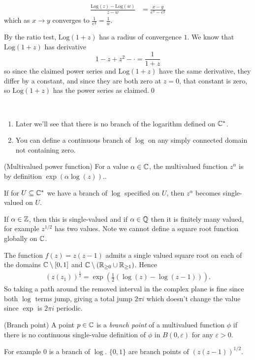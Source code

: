 \documentclass{article}
\newcommand{\Log}{\mathrm{Log}}
\begin{document}
\begin{align*}
	\frac{\Log(z)-\Log(w)}{z-w} &= \frac{x-y}{e^x-e^y}
\end{align*}
which as $ x\to y $ converges to $ \frac 1{e^y} = \frac 1w $.\par
By the ratio test, $ \Log(1+z) $ has a radius of convergence $ 1 $. We know that $ \Log(1+z) $ has derivative
\[
	1-z+z^2-\cdot = \frac 1{1+z}
\]
so since the claimed power series and $ \Log(1+z) $ have the same derivative, they differ by a constant, and since they are both zero at $ z=0 $, that constant is zero, so $ \Log(1+z) $ has the power series as claimed.\qed
\begin{remark}
  \
  \begin{enumerate}
	  \item Later we'll see that there is no branch of the logarithm defined on $ \mathbb{C}^* $.
	  \item You can define a continuous branch of $ \log $ on any simply connected domain not containing zero.
  \end{enumerate}
\end{remark}
\begin{definition}
	(Multivalued power function) For a value $ \alpha\in \mathbb{C} $, the multivalued function $ z^\alpha $ is by definition $ \exp(\alpha\log(z)). $.
\end{definition}
\begin{remark}
	If for $ U\subseteq \mathbb{C}^* $ we have a branch of $ \log $ specified on $ U $, then $ z^\alpha $ becomes single-valued on $ U $.
\end{remark}
\begin{remark}
	If $ \alpha\in \mathbb{Z} $, then this is single-valued and if $ \alpha\in \mathbb{Q} $ then it is finitely many valued, for example $ z^{1/2} $ has two values. Note we cannot define a square root function globally on $ \mathbb{C} $.
\end{remark}
The function $ f(z) = z(z-1) $ admits a single valued square root on each of the domains $ \mathbb{C}\setminus [0,1] $ and $ \mathbb{C}\setminus (\mathbb{R}_{\ge 0} \cup \mathbb{R}_{\ge 1}) $. Hence
\begin{align*}
	(z(z_1))^{\frac 12} = \exp(\frac 12 (\log(z) - \log(z-1))).
\end{align*}
So taking a path around the removed interval in the complex plane is fine since both $\log$ terms jump, giving a total jump $ 2\pi i$ which doesn't change the value since $ \exp $ is $ 2\pi i $ periodic.
\begin{definition}
	(Branch point) A point $ p\in \mathbb{C} $ is a \textit{branch point} of a multivalued function $ \phi $ if there is no continuous single-value definition of $ \phi $ in $ B(0,\varepsilon) $ for any $ \varepsilon > 0 $.
\end{definition}
For example $ 0 $ is a branch of $ \log $. $ \{0,1\} $ are branch points of $ (z(z-1))^{1/2} $.
\end{document}

